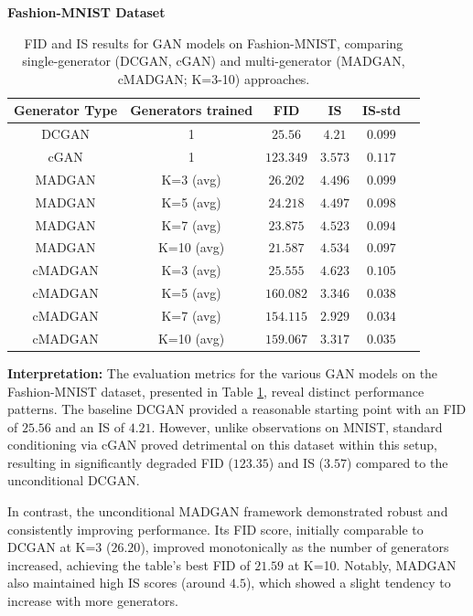 \noindent\textbf{Fashion-MNIST Dataset}
\begin{table}[H]
    \centering
    \begin{tabular}{|c|c|c|c|c|c|}
        \hline
        Generator Type & Generators trained & FID & IS & IS-std \\
        \hline
        DCGAN & 1 & $25.56$ & $4.21$ & $0.099$ \\
        \hline
        cGAN & 1 & $123.349$ & $3.573$ & $0.117$ \\
        \hline
        MADGAN & K=3 (avg) & $26.202$ & $4.496$ & $0.099$ \\
        \hline
        MADGAN & K=5 (avg) & $24.218$ & $4.497$ & $0.098$ \\
        \hline
        MADGAN & K=7 (avg) & $23.875$ & $4.523$ & $0.094$ \\
        \hline
        MADGAN & K=10 (avg) & $21.587$ & $4.534$ & $0.097$ \\
        \hline
        cMADGAN & K=3 (avg) & $25.555$ & $4.623$ & $0.105$ \\
        \hline
        cMADGAN & K=5 (avg) & $160.082$ & $3.346$ & $0.038$ \\
        \hline
        cMADGAN & K=7 (avg) & $154.115$ & $2.929$ & $0.034$ \\
        \hline
        cMADGAN & K=10 (avg) & $159.067$ & $3.317$ & $0.035$ \\
        \hline
    \end{tabular}
    \caption{FID and IS results for GAN models on Fashion-MNIST, comparing single-generator (DCGAN, cGAN) and multi-generator (MADGAN, cMADGAN; K=3-10) approaches.}
    \label{tab:exp_fashionmnist_fid_is}
\end{table}
\textbf{Interpretation:} The evaluation metrics for the various GAN models on the Fashion-MNIST dataset, presented in Table \ref{tab:exp_fashionmnist_fid_is}, reveal distinct performance patterns. The baseline DCGAN provided a reasonable starting point with an FID of $25.56$ and an IS of $4.21$. However, unlike observations on MNIST, standard conditioning via cGAN proved detrimental on this dataset within this setup, resulting in significantly degraded FID ($123.35$) and IS ($3.57$) compared to the unconditional DCGAN.

In contrast, the unconditional MADGAN framework demonstrated robust and consistently improving performance. Its FID score, initially comparable to DCGAN at K=3 ($26.20$), improved monotonically as the number of generators increased, achieving the table's best FID of $21.59$ at K=10. Notably, MADGAN also maintained high IS scores (around $4.5$), which showed a slight tendency to increase with more generators.

